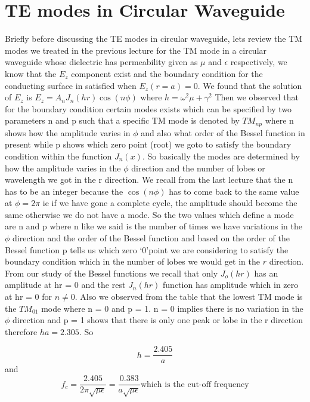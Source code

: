\chapter{TE modes in Circular Waveguide}
Briefly  before  discussing the TE modes in circular waveguide, lets review the TM modes we treated in the previous lecture for the TM   mode in a circular waveguide whose dielectric has permeability given as $\mu$ and $\epsilon$ respectively, we know that the $E_z$ component exist and the boundary condition for the conducting surface in satisfied when $E_z(r=a)= 0$. We found that the solution of $E_z$ is $E_z = A_n J_n(hr)\cos(n\phi)$  where $h= \omega^2\mu + \gamma^2$  Then we observed that for the boundary condition certain modes exists which can be specified by two parameters n and p such that a specific TM mode is denoted by $TM_{np}$ where n shows how the amplitude varies in $\phi$ and also what order of the Bessel function in present while p shows which zero point (root) we goto to satisfy the boundary condition within the function $J_n(x)$. So  basically the modes are determined by how the amplitude varies in the $\phi$ direction and the number of lobes or wavelength we got in the r direction. We recall from  the last lecture that the n has to be an integer because the $\cos(n\phi)$ has to come back to the same value at $\phi=2\pi$ ie if we have gone a complete cycle, the amplitude should become the same otherwise we do not have a mode. So the two values which define a mode are n and p where  n like we said is the number of times we have variations in the $\phi$ direction and the order of the Bessel function and based on the order of the Bessel function p tells us which zero \textquoteleft0\textquoteright point we are considering to satisfy the boundary condition which in the number of lobes we would get in the $r$ direction. From our study of the Bessel functions we recall that only $J_o(hr)$ has an amplitude at hr = 0 and the rest $J_n(hr)$ function has amplitude which in zero at hr = 0 for $ n \ne 0$. Also we observed from the table that the lowest TM mode is the $TM_{01}$ mode where n = 0 and p = 1.  n = 0 implies there is no variation in the $\phi$ direction and p = 1 shows that there is only one peak or lobe in the r direction therefore $ha = 2.305$. So

$$ h = \frac{2.405}{a}$$ and $$f_c = \frac{2.405}{2\pi\sqrt{\mu\epsilon}} = \frac{0.383}{a\sqrt{\mu\epsilon}}\text{which is the cut-off frequency}$$

